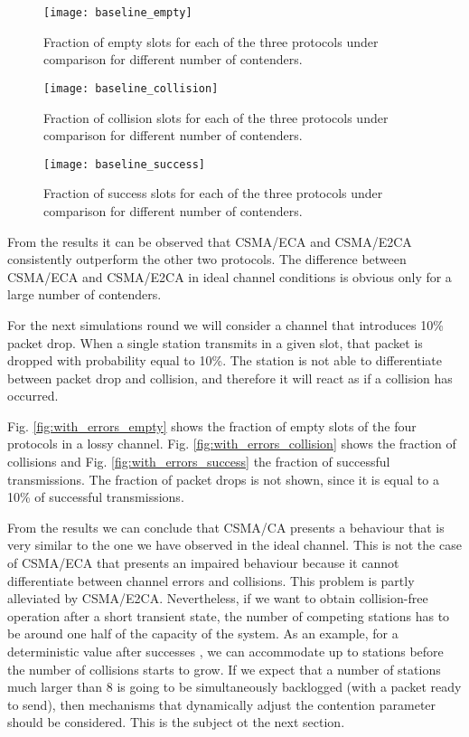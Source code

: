 \documentclass[journal]{IEEEtran}
\begin{document}
\begin{figure}[!t]
\centering
\texttt{[image: baseline\_empty]}
\caption{Fraction of empty slots for each of the three protocols under comparison for different number of contenders.}
\label{fig:baseline_empty}
\end{figure}

\begin{figure}[!t]
\centering
\texttt{[image: baseline\_collision]}
\caption{Fraction of collision slots for each of the three protocols under comparison for different number of contenders.}
\label{fig:baseline_collision}
\end{figure}


\begin{figure}[!t]
\centering
\texttt{[image: baseline\_success]}
\caption{Fraction of success slots for each of the three protocols under comparison for different number of contenders.}
\label{fig:baseline_success}
\end{figure}

From the results it can be observed that CSMA/ECA and CSMA/E2CA consistently outperform the other two protocols. The difference between CSMA/ECA and CSMA/E2CA in ideal channel conditions is obvious only for a large number of contenders.

For the next simulations round we will consider a channel that introduces 10\% packet drop. When a single station transmits in a given slot, that packet is dropped with probability equal to 10\%. The station is not able to differentiate between packet drop and collision, and therefore it will react as if a collision has occurred.

Fig. \ref{fig:with_errors_empty} shows the fraction of empty slots of the four protocols in a lossy channel. Fig. \ref{fig:with_errors_collision} shows the fraction of collisions and Fig. \ref{fig:with_errors_success} the fraction of successful transmissions. The fraction of packet drops is not shown, since it is equal to a 10\% of successful transmissions. 

From the results we can conclude that CSMA/CA presents a behaviour that is very similar to the one we have observed in the ideal channel. This is not the case of CSMA/ECA that presents an impaired behaviour because it cannot differentiate between channel errors and collisions. This problem is partly alleviated by CSMA/E2CA. Nevertheless, if we want to obtain collision-free operation after a short transient state, the number of competing stations has to be around one half of the capacity of the system. As an example, for a deterministic value after successes , we can accommodate up to  stations before the number of collisions starts to grow. If we expect that a number of stations much larger than 8 is going to be simultaneously backlogged (with a packet ready to send), then mechanisms that dynamically adjust the contention parameter should be considered. This is the subject ot the next section.
\end{document}
